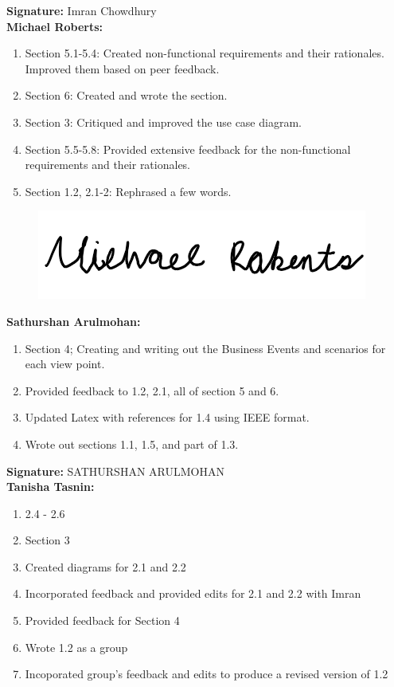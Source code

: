 \documentclass[]{article}
\begin{document}
\textbf{Signature:} Imran Chowdhury \\

\textbf{Michael Roberts:}
\begin{enumerate}
	\item Section 5.1-5.4: Created non-functional requirements and their rationales. Improved them based on peer feedback.
	\item Section 6: Created and wrote the section.
	\item Section 3: Critiqued and improved the use case diagram.
	\item Section 5.5-5.8: Provided extensive feedback for the non-functional requirements and their rationales.
	\item Section 1.2, 2.1-2: Rephrased a few words.
\end{enumerate}

\begin{figure}[H]
 	\centering
    \includegraphics[width=\textwidth]{image/A_Michael_Roberts_Signature.png}
\end{figure}

\textbf{Sathurshan Arulmohan:}
\begin{enumerate}
	\item Section 4; Creating and writing out the Business Events and scenarios for each view point.
	\item Provided feedback to 1.2, 2.1, all of section 5 and 6.
	\item Updated Latex with references for 1.4 using IEEE format.
	\item Wrote out sections 1.1, 1.5, and part of 1.3.
\end{enumerate}

\textbf{Signature:} SATHURSHAN ARULMOHAN \\

\textbf{Tanisha Tasnin:}
\begin{enumerate}
	\item 2.4 - 2.6
	\item Section 3
	\item Created diagrams for 2.1 and 2.2
	\item Incorporated feedback and provided edits for 2.1 and 2.2 with Imran
	\item Provided feedback for Section 4
	\item Wrote 1.2 as a group
	\item Incoporated group's feedback and edits to produce a revised version of 1.2
\end{enumerate}
\end{document}
